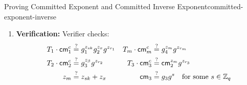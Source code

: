 \begin{protocol}{Proving Committed Exponent and Committed Inverse Exponent}{committed-exponent-inverse}
\begin{enumerate}
    \item \textbf{Verification:} Verifier checks:
    \begin{align*}
        T_1 \cdot \mathsf{cm}_1^c &\stackrel{?}{=} g_1^{z_{sk}} g_2^{z_x} g^{z_{r_1}} &
        T_m \cdot \mathsf{cm}_m^c &\stackrel{?}{=} g_4^{z_m} g^{z_{r_m}} \\
        T_2 \cdot \mathsf{cm}_2^c &\stackrel{?}{=} g_3^{z_\beta} g^{z_{r_2}} &
        T_3 \cdot \mathsf{cm}_3^c &\stackrel{?}{=} \mathsf{cm}_2^{z_m} g^{z_{r_3}} \\
        z_m &\stackrel{?}{=} z_{sk} + z_x &
        \mathsf{cm}_3 &\stackrel{?}{=} g_3 g^{s} \quad \text{for some } s \in \mathbb{Z}_q
    \end{align*}
\end{enumerate}
\end{protocol}






























































